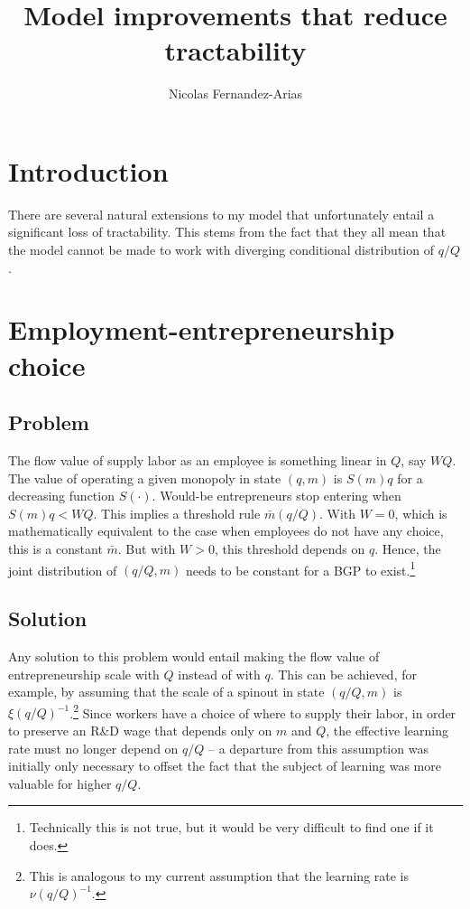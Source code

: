 \documentclass[11pt,english]{article}
\theoremstyle{remark}
\begin{document}
	
\title{Model improvements that reduce tractability}
\author{Nicolas Fernandez-Arias}
\maketitle

\section{Introduction}

There are several natural extensions to my model that unfortunately entail a significant loss of tractability. This stems from the fact that they all mean that the model cannot be made to work with diverging conditional distribution of $q/Q$. 

\section{Employment-entrepreneurship choice}

\subsection*{Problem}

The flow value of supply labor as an employee is something linear in $Q$, say $W Q$. The value of operating a given monopoly in state $(q,m)$ is $S(m)q$ for a decreasing function $S(\cdot)$. Would-be entrepreneurs stop entering when $S(m)q < WQ$. This implies a threshold rule $\bar{m}(q/Q)$. With $W = 0$, which is mathematically equivalent to the case when employees do not have any choice, this is a constant $\bar{m}$. But with $W > 0$, this threshold depends on $q$. Hence, the joint distribution of $(q/Q,m)$ needs to be constant for a BGP to exist.\footnote{Technically this is not true, but it would be very difficult to find one if it does.}

\subsection*{Solution}

Any solution to this problem would entail making the flow value of entrepreneurship scale with $Q$ instead of with $q$. This can be achieved, for example, by assuming that the scale of a spinout in state $(q/Q,m)$ is $\xi (q/Q)^{-1}$.\footnote{This is analogous to my current assumption that the learning rate is $\nu (q/Q)^{-1}$.} Since workers have a choice of where to supply their labor, in order to preserve an R\&D wage that depends only on $m$ and $Q$, the effective learning rate must no longer depend on $q/Q$ -- a departure from this assumption was initially only necessary to offset the fact that the subject of learning was more valuable for higher $q/Q$. 
\end{document}
